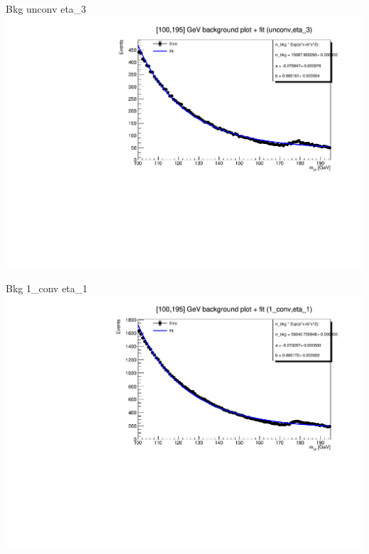 \documentclass[10pt,UKenglish, leqno, xcolor = dvipsnames]{beamer}
\begin{document}
		\begin{frame}{Bkg unconv eta\_3}
			\vfill
			\includegraphics[width=1.\textwidth]{../images/week_9/bkg_100_195GeV_fit_unconv_eta_3.pdf}
			\vfill
		\end{frame}
	
		\begin{frame}{Bkg 1\_conv eta\_1}
			\vfill
			\includegraphics[width=1.\textwidth]{../images/week_9/bkg_100_195GeV_fit_1_conv_eta_1.pdf}
			\vfill
		\end{frame}
		
\end{document}
